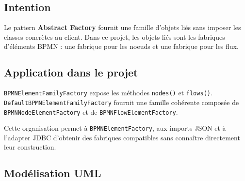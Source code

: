 \documentclass[12pt,a4paper]{article}
\begin{document}
\subsection{Intention}

Le pattern \textbf{Abstract Factory} fournit une famille d'objets liés sans imposer les classes concrètes au client. Dans ce projet, les objets liés sont les fabriques d'éléments BPMN : une fabrique pour les noeuds et une fabrique pour les flux.

\subsection{Application dans le projet}

\texttt{BPMNElementFamilyFactory} expose les méthodes \texttt{nodes()} et \texttt{flows()}. \texttt{DefaultBPMNElementFamilyFactory} fournit une famille cohérente composée de \texttt{BPMNNodeElementFactory} et de \texttt{BPMNFlowElementFactory}.

Cette organisation permet à \texttt{BPMNElementFactory}, aux imports JSON et à l'adapter JDBC d'obtenir des fabriques compatibles sans connaître directement leur construction.

\subsection{Modélisation UML}
\end{document}
